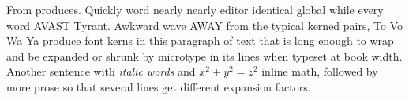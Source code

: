 \documentclass[11pt]{book}
\begin{document}
From produces. Quickly word nearly nearly editor identical global while every
word AVAST Tyrant. Awkward wave AWAY from the typical kerned pairs, To Vo Wa Ya
produce font kerns in this paragraph of text that is long enough to wrap and
be expanded or shrunk by microtype in its lines when typeset at book width.
Another sentence with \emph{italic words} and $x^2 + y^2 = z^2$ inline math,
followed by more prose so that several lines get different expansion factors.
\end{document}
